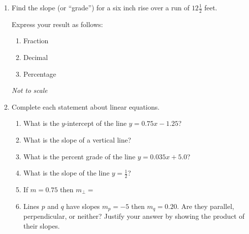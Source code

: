 \begin{enumerate}
\item Find the slope (or ``grade'') for a six inch rise over a run of $12 \frac{1}{2}$ feet.
\begin{multicols}{2}
  Express your result as follows: 
\begin{enumerate}
  \item Fraction
  \item Decimal
  \item Percentage
\end{enumerate}
\begin{flushright}
  \emph{Not to scale}
\end{flushright}
\end{multicols}

\item Complete each statement about linear equations.
\begin{enumerate}[itemsep=0.5cm]
  \item What is the $y$-intercept of the line $y = 0.75x - 1.25$?
  \item What is the slope of a vertical line?
  \item What is the percent grade of the line $\displaystyle y = 0.035x + 5.0$?
  \item What is the slope of the line $y=\frac{1}{2}$?
  \item If $m = 0.75$ then $m_{\perp}=$
  \item Lines $p$ and $q$ have slopes $m_p = -5$ then $m_q= 0.20$. Are they parallel, perpendicular, or neither? Justify your answer by showing the product of their slopes.
  \end{enumerate}


\end{enumerate}
